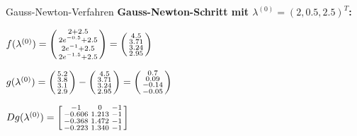 \begin{example2}{Gauss-Newton-Verfahren}
\textbf{Gauss-Newton-Schritt mit $\lambda^{(0)} = (2, 0.5, 2.5)^T$:}

$f(\lambda^{(0)}) = \begin{psmallmatrix} 2 + 2.5 \\ 2e^{-0.5} + 2.5 \\ 2e^{-1} + 2.5 \\ 2e^{-1.5} + 2.5 \end{psmallmatrix} = \begin{psmallmatrix} 4.5 \\ 3.71 \\ 3.24 \\ 2.95 \end{psmallmatrix}$

$g(\lambda^{(0)}) = \begin{psmallmatrix} 5.2 \\ 3.8 \\ 3.1 \\ 2.9 \end{psmallmatrix} - \begin{psmallmatrix} 4.5 \\ 3.71 \\ 3.24 \\ 2.95 \end{psmallmatrix} = \begin{psmallmatrix} 0.7 \\ 0.09 \\ -0.14 \\ -0.05 \end{psmallmatrix}$

$Dg(\lambda^{(0)}) = \begin{bsmallmatrix}
-1 & 0 & -1 \\
-0.606 & 1.213 & -1 \\
-0.368 & 1.472 & -1 \\
-0.223 & 1.340 & -1
\end{bsmallmatrix}$


\end{example2}
